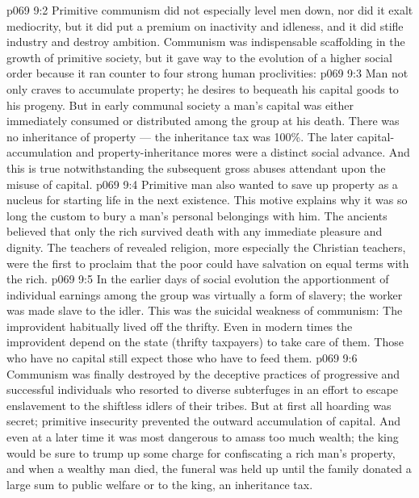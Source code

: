 \vs p069 9:2 \pc Primitive communism did not especially level men down, nor did it exalt mediocrity, but it did put a premium on inactivity and idleness, and it did stifle industry and destroy ambition. Communism was indispensable scaffolding in the growth of primitive society, but it gave way to the evolution of a higher social order because it ran counter to four strong human proclivities:
\vs p069 9:3 \bibnobreakspace {} Man not only craves to accumulate property; he desires to bequeath his capital goods to his progeny. But in early communal society a man’s capital was either immediately consumed or distributed among the group at his death. There was no inheritance of property --- the inheritance tax was 100\%. The later capital\hyp{}accumulation and property\hyp{}inheritance mores were a distinct social advance. And this is true notwithstanding the subsequent gross abuses attendant upon the misuse of capital.
\vs p069 9:4 \bibnobreakspace {} Primitive man also wanted to save up property as a nucleus for starting life in the next existence. This motive explains why it was so long the custom to bury a man’s personal belongings with him. The ancients believed that only the rich survived death with any immediate pleasure and dignity. The teachers of revealed religion, more especially the Christian teachers, were the first to proclaim that the poor could have salvation on equal terms with the rich.
\vs p069 9:5 \bibnobreakspace {} In the earlier days of social evolution the apportionment of individual earnings among the group was virtually a form of slavery; the worker was made slave to the idler. This was the suicidal weakness of communism: The improvident habitually lived off the thrifty. Even in modern times the improvident depend on the state (thrifty taxpayers) to take care of them. Those who have no capital still expect those who have to feed them.
\vs p069 9:6 \bibnobreakspace {} Communism was finally destroyed by the deceptive practices of progressive and successful individuals who resorted to diverse subterfuges in an effort to escape enslavement to the shiftless idlers of their tribes. But at first all hoarding was secret; primitive insecurity prevented the outward accumulation of capital. And even at a later time it was most dangerous to amass too much wealth; the king would be sure to trump up some charge for confiscating a rich man’s property, and when a wealthy man died, the funeral was held up until the family donated a large sum to public welfare or to the king, an inheritance tax.
